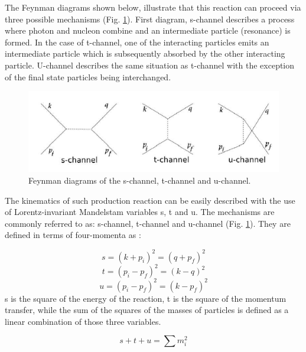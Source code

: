 \indent The Feynman diagrams shown below, illustrate that this reaction can proceed via three possible mechanisms (Fig. \ref{mandelstam}). First diagram, s-channel describes a process where photon and nucleon combine and an intermediate particle (resonance) is formed. In the case of t-channel, one of the interacting particles emits an intermediate particle which is subsequently absorbed by the other interacting particle. U-channel describes the same situation as t-channel with the exception of the final state particles being interchanged.

\begin{figure}[H]
\begin{center}
\includegraphics[scale=0.6]{pictures/png/mandelstam.png}
\caption{Feynman diagrams of the s-channel, t-channel and u-channel.}
\label{mandelstam}
\end{center}
\end{figure}

\indent The kinematics of such production reaction can be easily described with the use of Lorentz-invariant Mandelstam variables s, t and u. The mechanisms are commonly referred to as: s-channel, t-channel and u-channel (Fig. \ref{mandelstam}). They are defined in terms of four-momenta as \cite{walker}:

\begin{equation}
s=(k+p_{i})^{2}=(q+p_{f})^{2}
\end{equation}
\begin{equation}
t=(p_{i}-p_{f})^{2}=(k-q)^{2}
\end{equation}
\begin{equation}
u=(p_{i}-p_{f})^{2}=(k-p_{f})^{2}
\end{equation}
s is the square of the energy of the reaction, t is the square of the momentum transfer, while the sum of the squares of the masses of particles is defined as a linear combination of those three variables.

\begin{equation}
s+t+u=\sum m^{2}_{i}
\end{equation}

